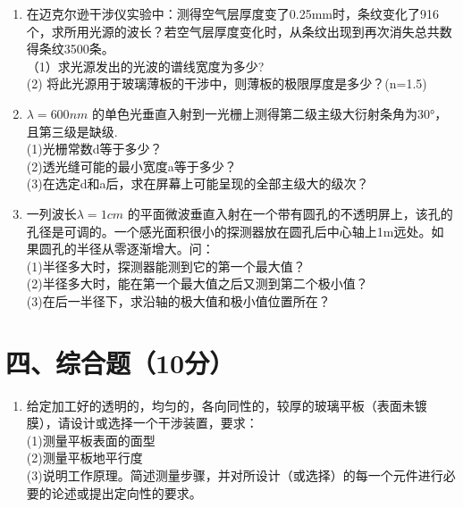 \documentclass[12pt, a4paper]{article}
\theoremstyle{solution}
\begin{document}
\begin{enumerate}
    \item 在迈克尔逊干涉仪实验中：测得空气层厚度变了0.25mm时，条纹变化了916个，求所用光源的波长？若空气层厚度变化时，从条纹出现到再次消失总共数得条纹3500条。\\（1）求光源发出的光波的谱线宽度为多少?\\(2) 将此光源用于玻璃薄板的干涉中，则薄板的极限厚度是多少？(\（n=1.5\）)

    \item \(\lambda=600nm\) 的单色光垂直入射到一光栅上测得第二级主级大衍射条角为30°，且第三级是缺级.\\(1)光栅常数d等于多少？\\(2)透光缝可能的最小宽度a等于多少？\\(3)在选定d和a后，求在屏幕上可能呈现的全部主级大的级次？
    \item 一列波长\(\lambda=1cm\) 的平面微波垂直入射在一个带有圆孔的不透明屏上，该孔的孔径是可调的。一个感光面积很小的探测器放在圆孔后中心轴上1m远处。如果圆孔的半径从零逐渐增大。问：\\(1)半径多大时，探测器能测到它的第一个最大值？\\(2)半径多大时，能在第一个最大值之后又测到第二个极小值？\\(3)在后一半径下，求沿轴的极大值和极小值位置所在？
\end{enumerate}
\section*{四、综合题（10分）}

\begin{enumerate}
    \item 给定加工好的透明的，均匀的，各向同性的，较厚的玻璃平板（表面未镀膜），请设计或选择一个干涉装置，要求：\\(1)测量平板表面的面型\\(2)测量平板地平行度\\(3)说明工作原理。简述测量步骤，并对所设计（或选择）的每一个元件进行必要的论述或提出定向性的要求。
\end{enumerate}
\end{document}
